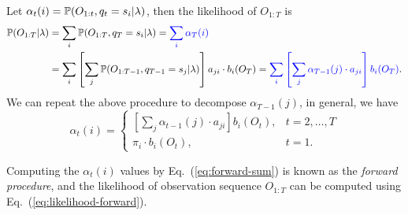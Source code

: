 Let $\alpha_t(i) = \mathbb{P}(O_{1:t}, q_t = s_i |\lambda)$, then the likelihood of $O_{1:T}$ is
\begin{alignat}{2}
\mathbb{P}(O_{1:T} |\lambda) 
&= \sum_{i} \mathbb{P}(O_{1:T}, q_T = s_i |\lambda) 
 = {\color{blue}{\sum_{i} \alpha_T(i)}}  \label{eq:likelihood-forward} \\
&= \sum_{i} \left[ \sum_{j} \mathbb{P}(O_{1:T-1}, q_{T-1} = s_j |\lambda) \right] a_{ji} \cdot b_i(O_T) 
 = {\color{blue}{\sum_{i} \left[ \sum_{j} \alpha_{T-1}(j) \cdot a_{ji} \right] b_i(O_T)}}. \nonumber
\end{alignat}
We can repeat the above procedure to decompose $\alpha_{T-1}(j)$, in general, we have
\begin{equation}
\label{eq:forward-sum}
\alpha_t(i) = \begin{cases}
               \left[ \sum_{j} \alpha_{t-1}(j) \cdot a_{ji} \right] b_i(O_t), & t=2,\dots,T \\
               \pi_i \cdot b_i(O_t), & t=1.
              \end{cases}
\end{equation}

Computing the $\alpha_t(i)$ values by Eq.~(\ref{eq:forward-sum}) is known as the \emph{forward procedure}, 
and the likelihood of observation sequence $O_{1:T}$ can be computed using Eq.~(\ref{eq:likelihood-forward}).

